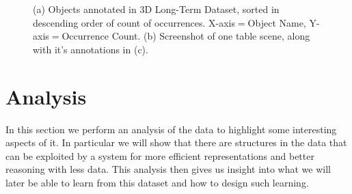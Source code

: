 \documentclass[letterpaper, 10 pt, conference]{ieeeconf}  %
\begin{document}
\begin{figure}[t]
\begin{center}
\\
\\
\caption{(a) Objects annotated in 3D Long-Term Dataset, sorted in descending order of count of occurrences. X-axis$=$Object Name, Y-axis$=$Occurrence Count. (b) Screenshot of one table scene, along with it's annotations in (c).}
\end{center}
\end{figure}


\section{Analysis}
\label{sec:Analysis}
In this section we perform an analysis of the data to highlight some
interesting aspects of it. In particular we will show that there are
structures in the data that can be exploited by a system for more
efficient representations and better reasoning with less data.  This
analysis then gives us insight into what we will later be able to
learn from this dataset and how to design such learning.
\end{document}
